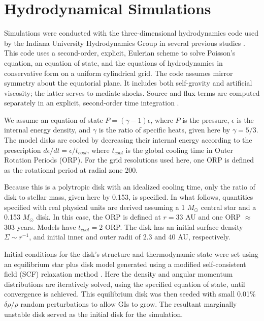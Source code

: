 \documentclass[manuscript]{aastex} %
\begin{document}
\section{Hydrodynamical Simulations}

Simulations were conducted with the three-dimensional hydrodynamics code used by the Indiana University Hydrodynamics Group in several previous studies \citep{pickett1998, pickett2000, mejiaphd2004, mejia2005, boley2006, cai2008}.  This code uses a second-order, explicit, Eulerian scheme to solve Poisson's equation, an equation of state, and the equations of hydrodynamics in conservative form on a uniform cylindrical grid.  The code assumes mirror symmetry about the equatorial plane. It includes both self-gravity and artificial viscosity; the latter serves to 
mediate shocks. Source and flux terms \citep{norman1986} are computed separately in an explicit, second-order time integration \citep{albada1982,christodoulou1991,yangphd1992}.

We assume an equation of state $P = (\gamma -1)\epsilon$, where $P$ is the pressure, $\epsilon$ is the internal energy density, and $\gamma$ is the ratio of specific heats, given here by $\gamma = 5/3$.  The model disks are cooled by decreasing their internal energy according to the prescription $d\epsilon/dt = \epsilon / t_{cool}$, where $t_{cool}$ is the global cooling time in Outer Rotation Periods (ORP).  For the grid resolutions used here, one ORP is defined as the rotational period at radial zone 200.


Because this is a polytropic disk with an idealized cooling time, only the ratio of disk to stellar mass, given here by 0.153, is specified.  In what follows, quantities specified with real physical units are derived assuming a 1 $M_\odot$ central star and a 0.153  $M_\odot$ disk. In this case, the ORP is defined at $r = 33$ AU and one ORP $\approx$ 303 years.  Models have $t_{cool} = 2$ ORP. The disk has an initial surface density $\Sigma \sim r^{ -1}$, and initial inner and outer radii of 2.3 and 40 AU, respectively.  

Initial conditions for the disk's structure and thermodynamic state were set using an equilibrium star plus disk model generated using a modified \citet{hachisu1986} self-consistent field (SCF) relaxation method \citep{pickett1996,pickett2003,mejiaphd2004,mejia2005,cai2006}. Here  the density and angular momentum distributions are iteratively solved, using the specified equation of state,  until convergence is achieved. This  equilibrium disk was then seeded with small 0.01\% $\delta\rho/\rho$ random perturbations to allow GIs to grow.  The resultant marginally unstable disk served as the initial disk for the simulation.
\end{document}
